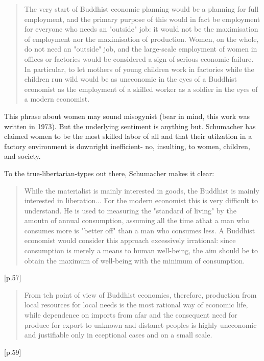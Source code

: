 \documentclass[10pt,letterpaper,openany]{book}
\begin{document}

\begin{quote}
The very start of Buddhist economic planning would be a planning for full employment, and the primary purpose of this would in fact be employment for everyone who needs an "outside" job: it would not be the maximisation of employment nor the maximisation of production. Women, on the whole, do not need an "outside" job, and the large-scale employment of women in offices or factories would be considered a sign of serious economic failure. In particular, to let mothers of young children work in factories while the children run wild would be as uneconomic in the eyes of a Buddhist economist as the employment of a skilled worker as a soldier in the eyes of a modern economist.
\end{quote}

This phrase about women may sound misogynist (bear in mind, this work was written in 1973). But the underlying sentiment is anything but. Schumacher has claimed women to be the most skilled labor of all and that their utilzation in a factory environment is downright inefficient- no, insulting, to women, children, and society.

To the true-libertarian-types out there, Schumacher makes it clear:

\begin{quote}
While the materialist is mainly interested in goods, the Buddhist is mainly interested in liberation... For the modern economist this is very difficult to understand. He is used to measuring the "standard of living" by the amoutn of annual consumption, assuming all the time athat a man who consumes more is "better off" than a man who consumes less. A Buddhist economist would consider this approach excessively irrational: since consumption is merely a means to human well-being, the aim should be to obtain the maximum of well-being with the minimum of consumption.
\end{quote} [p.57]

\begin{quote}
From teh point of view of Buddhist economics, therefore, production from local resources for local needs is the most rational way of economic life, while dependence on imports from afar and the consequent need for produce for export to unknown and distanct peoples is highly uneconomic and justifiable only in eceptional cases and on a small scale.
\end{quote} [p.59]
\end{document}
